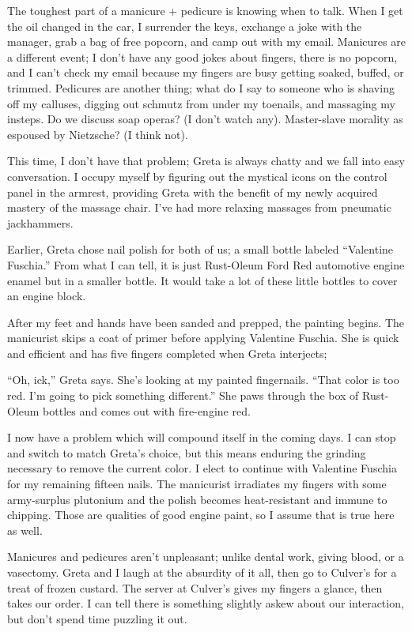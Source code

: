 \documentclass[
  letterpaper,
  DIV=11,
  numbers=noendperiod]{scrreprt}
\begin{document}
The toughest part of a manicure + pedicure is knowing when to talk. When
I get the oil changed in the car, I surrender the keys, exchange a joke
with the manager, grab a bag of free popcorn, and camp out with my
email. Manicures are a different event; I don't have any good jokes
about fingers, there is no popcorn, and I can't check my email because
my fingers are busy getting soaked, buffed, or trimmed. Pedicures are
another thing; what do I say to someone who is shaving off my calluses,
digging out schmutz from under my toenails, and massaging my insteps. Do
we discuss soap operas? (I don't watch any). Master-slave morality as
espoused by Nietzsche? (I think not).

This time, I don't have that problem; Greta is always chatty and we fall
into easy conversation. I occupy myself by figuring out the mystical
icons on the control panel in the armrest, providing Greta with the
benefit of my newly acquired mastery of the massage chair. I've had more
relaxing massages from pneumatic jackhammers.

Earlier, Greta chose nail polish for both of us; a small bottle labeled
``Valentine Fuschia.'' From what I can tell, it is just Rust-Oleum Ford
Red automotive engine enamel but in a smaller bottle. It would take a
lot of these little bottles to cover an engine block.

After my feet and hands have been sanded and prepped, the painting
begins. The manicurist skips a coat of primer before applying Valentine
Fuschia. She is quick and efficient and has five fingers completed when
Greta interjects;

``Oh, ick,'' Greta says. She's looking at my painted fingernails. ``That
color is too red. I'm going to pick something different.'' She paws
through the box of Rust-Oleum bottles and comes out with fire-engine
red.

I now have a problem which will compound itself in the coming days. I
can stop and switch to match Greta's choice, but this means enduring the
grinding necessary to remove the current color. I elect to continue with
Valentine Fuschia for my remaining fifteen nails. The manicurist
irradiates my fingers with some army-surplus plutonium and the polish
becomes heat-resistant and immune to chipping. Those are qualities of
good engine paint, so I assume that is true here as well.

Manicures and pedicures aren't unpleasant; unlike dental work, giving
blood, or a vasectomy. Greta and I laugh at the absurdity of it all,
then go to Culver's for a treat of frozen custard. The server at
Culver's gives my fingers a glance, then takes our order. I can tell
there is something slightly askew about our interaction, but don't spend
time puzzling it out.
\end{document}
